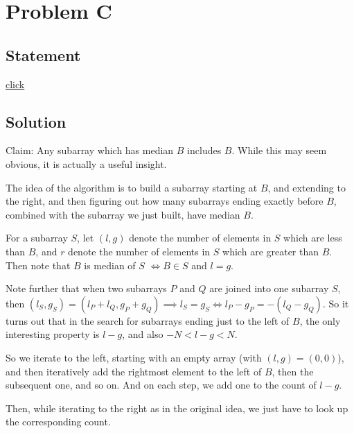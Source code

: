 \section{Problem C}
	\subsection{Statement}
		\href{http://foobar.iiitd.edu.in/contest/team/problem.php?id=529}{click}

	\subsection{Solution}
		Claim: Any subarray which has median $B$ includes $B$.
		While this may seem obvious, it is actually a useful insight.

		The idea of the algorithm is to build a subarray starting at $B$, and extending
		to the right, and then figuring out how many subarrays ending exactly before $B$,
		combined with the subarray we just built, have median $B$.

		For a subarray $S$, let $(l, g)$ denote the number of elements in $S$ which are
		less than $B$, and $r$ denote the number of elements in $S$ which are greater
		than $B$. Then note that $B$ is median of $S$ $\iff B \in S$ and $l = g$.

		Note further that when two subarrays $P$ and $Q$ are joined into one subarray
		$S$, then $(l_S, g_S) = (l_P + l_Q, g_P + g_Q) \implies l_S = g_S
		\iff l_P - g_P = -(l_Q - g_Q)$.
		So it turns out that in the search for subarrays ending just to the left of $B$,
		the only interesting property is $l - g$, and also $-N < l - g < N$.

		So we iterate to the left, starting with an empty array (with $(l, g) = (0, 0)$),
		and then iteratively add the rightmost element to the left of $B$, then the subsequent
		one, and so on. And on each step, we add one to the count of $l - g$.

		Then, while iterating to the right as in the original idea, we just have to look up the
		corresponding count.